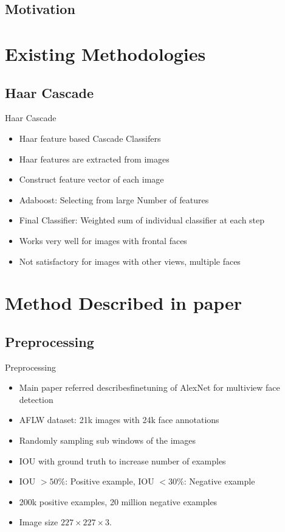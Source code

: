\documentclass{beamer}
\begin{document}
\subsection{Motivation}

\section{Existing Methodologies}
\subsection{Haar Cascade}
\begin{frame}{Haar Cascade}
  \begin{itemize}
      \item Haar feature based Cascade Classifers
      \item Haar features are extracted from images
      \item Construct feature vector of each image
      \item Adaboost: Selecting from large Number of features
      \item Final Classifier: Weighted sum of individual classifier at each step
      \item Works very well for images with frontal faces
      \item Not satisfactory for images with other views, multiple faces
  \end{itemize}
\end{frame}

\section{Method Described in paper}
\subsection{Preprocessing}
\begin{frame}{Preprocessing}
  \begin{itemize}
      \item Main paper referred \cite{paper} describesfinetuning of AlexNet for multiview face detection
      \item AFLW dataset: 21k images with 24k face annotations
      \item Randomly sampling sub windows of the images
      \item IOU with ground truth to increase number of examples
      \item IOU $> 50\%$: Positive example, IOU $< 30\%$: Negative example
      \item 200k positive examples, 20 million negative examples
      \item Image size $227\times227\times3$.
  \end{itemize}
\end{frame}
\end{document}
